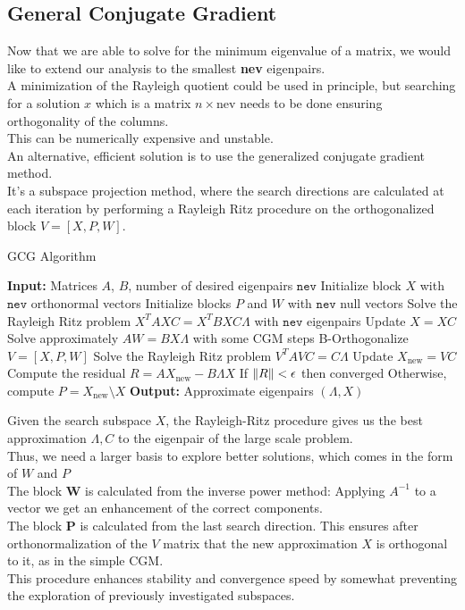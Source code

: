 \subsection{General Conjugate Gradient}
Now that we are able to solve for the minimum eigenvalue of a matrix, we would like to extend our analysis to the smallest \textbf{nev} eigenpairs.
\\A minimization of the Rayleigh quotient could be used in principle, but searching for a solution $x$ which is a matrix $n\times\text{nev}$ needs to be done ensuring orthogonality of the columns.
\\This can be numerically expensive and unstable.
\\An alternative, efficient solution is to use the generalized conjugate gradient method.
\\It's a subspace projection method, where the search directions are calculated at each iteration by performing a Rayleigh Ritz procedure on the orthogonalized block $V=[X, P, W]$.

\begin{algorithm}[H]
\caption{GCG Algorithm}
\begin{algorithmic}[1]
\State \textbf{Input:} Matrices \( A \), \( B \), number of desired eigenpairs \( \texttt{nev} \)
\State Initialize block \( X \) with \( \texttt{nev} \) orthonormal vectors
\State Initialize blocks \( P \) and \( W \) with \( \texttt{nev} \) null vectors
\State Solve the Rayleigh Ritz problem \(X^T A X C= X^T B X C \Lambda \) with \( \texttt{nev} \) eigenpairs
\State Update \(X=X C\)
    \State Solve approximately \( AW = BX\Lambda \) with some CGM steps
    \State B-Orthogonalize \( V=[X, P, W] \)
    \State Solve the Rayleigh Ritz problem \(V^T A V C= C\Lambda \)
    \State Update \(X_\text{new} =V C\)
    \State Compute the residual \( R = AX_\text{new} - B\Lambda X \) 
    \State If \( \norm{R} < \epsilon \) then converged
    \State Otherwise, compute \( P = X_\text{new} \setminus X \) 
\EndWhile
\State \textbf{Output:} Approximate eigenpairs \( (\Lambda, X) \)
\end{algorithmic}
\end{algorithm}
Given the search subspace $X$, the Rayleigh-Ritz procedure gives us the best approximation $\Lambda, C$ to the eigenpair of the large scale problem.
\\Thus, we need a larger basis to explore better solutions, which comes in the form of $W$ and $P$
\\The block $\mathbf W$ is calculated from the inverse power method: Applying $A^{-1}$ to a vector we get an enhancement of the correct components.
\\The block $\mathbf P$ is calculated from the last search direction. This ensures after orthonormalization of the $V$ matrix that the new approximation $X$ is orthogonal to it, as in the simple CGM.
\\This procedure enhances stability and convergence speed by somewhat preventing the exploration of previously investigated subspaces.


